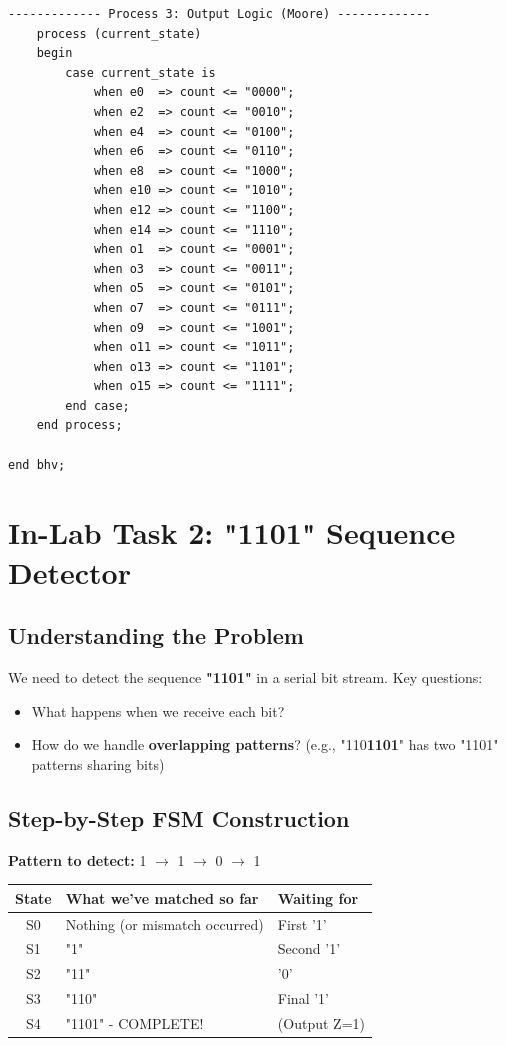 \documentclass[12pt,a4paper]{article}
\begin{document}
\begin{lstlisting}[style=vhdlstyle]
------------- Process 3: Output Logic (Moore) -------------
    process (current_state)
    begin
        case current_state is
            when e0  => count <= "0000";
            when e2  => count <= "0010";
            when e4  => count <= "0100";
            when e6  => count <= "0110";
            when e8  => count <= "1000";
            when e10 => count <= "1010";
            when e12 => count <= "1100";
            when e14 => count <= "1110";
            when o1  => count <= "0001";
            when o3  => count <= "0011";
            when o5  => count <= "0101";
            when o7  => count <= "0111";
            when o9  => count <= "1001";
            when o11 => count <= "1011";
            when o13 => count <= "1101";
            when o15 => count <= "1111";
        end case;
    end process;

end bhv;
\end{lstlisting}

\newpage
\section{In-Lab Task 2: "1101" Sequence Detector}

\subsection{Understanding the Problem}
We need to detect the sequence \textbf{"1101"} in a serial bit stream. Key questions:
\begin{itemize}
    \item What happens when we receive each bit?
    \item How do we handle \textbf{overlapping patterns}? (e.g., "110\textbf{1101}" has two "1101" patterns sharing bits)
\end{itemize}

\subsection{Step-by-Step FSM Construction}

\textbf{Pattern to detect:} 1 $\rightarrow$ 1 $\rightarrow$ 0 $\rightarrow$ 1

\begin{center}
\begin{tabular}{|c|l|l|}
\hline
\textbf{State} & \textbf{What we've matched so far} & \textbf{Waiting for} \\
\hline
S0 & Nothing (or mismatch occurred) & First '1' \\
S1 & "1" & Second '1' \\
S2 & "11" & '0' \\
S3 & "110" & Final '1' \\
S4 & "1101" - COMPLETE! & (Output Z=1) \\
\hline
\end{tabular}
\end{center}
\end{document}
